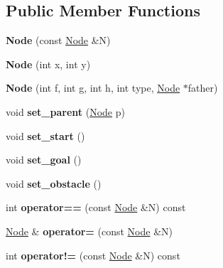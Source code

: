 \subsection*{Public Member Functions}
\begin{DoxyCompactItemize}
\item 
\hypertarget{class_node_a7c677bda3076d3d8eccdf7831e862ac2}{{\bfseries Node} (const \hyperlink{class_node}{Node} \&N)}\label{class_node_a7c677bda3076d3d8eccdf7831e862ac2}

\item 
\hypertarget{class_node_a23a19f53dfbb18fec58cdac90de3d144}{{\bfseries Node} (int x, int y)}\label{class_node_a23a19f53dfbb18fec58cdac90de3d144}

\item 
\hypertarget{class_node_af1d32d3c0489e11f081ff36db1394e12}{{\bfseries Node} (int f, int g, int h, int type, \hyperlink{class_node}{Node} $\ast$father)}\label{class_node_af1d32d3c0489e11f081ff36db1394e12}

\item 
\hypertarget{class_node_acfef82742f32525c7b62a6fb99f533c2}{void {\bfseries set\+\_\+parent} (\hyperlink{class_node}{Node} p)}\label{class_node_acfef82742f32525c7b62a6fb99f533c2}

\item 
\hypertarget{class_node_a05b14800e32cabc3631c4e74c09d6ad6}{void {\bfseries set\+\_\+start} ()}\label{class_node_a05b14800e32cabc3631c4e74c09d6ad6}

\item 
\hypertarget{class_node_ad92eea96378329a57cbd2a867e883119}{void {\bfseries set\+\_\+goal} ()}\label{class_node_ad92eea96378329a57cbd2a867e883119}

\item 
\hypertarget{class_node_ab7860d8fd548624055e04e4152233fc1}{void {\bfseries set\+\_\+obstacle} ()}\label{class_node_ab7860d8fd548624055e04e4152233fc1}

\item 
\hypertarget{class_node_ac38b044237716c27fc53d55984919569}{int {\bfseries operator==} (const \hyperlink{class_node}{Node} \&N) const }\label{class_node_ac38b044237716c27fc53d55984919569}

\item 
\hypertarget{class_node_aac90c7101fc00cb58eb15b8657bbf392}{\hyperlink{class_node}{Node} \& {\bfseries operator=} (const \hyperlink{class_node}{Node} \&N)}\label{class_node_aac90c7101fc00cb58eb15b8657bbf392}

\item 
\hypertarget{class_node_a3c2cd5ef2f31b2742c65b6a5321d2ca8}{int {\bfseries operator!=} (const \hyperlink{class_node}{Node} \&N) const }\label{class_node_a3c2cd5ef2f31b2742c65b6a5321d2ca8}


\end{DoxyCompactItemize}
